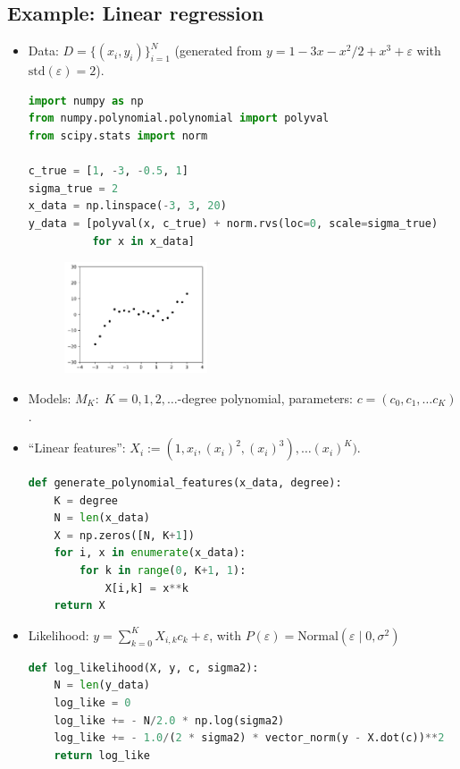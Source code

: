 \newpage
\subsection{Example: Linear regression}
\begin{itemize}
	\item Data: $D = \{(x_i, y_i)\}_{i=1}^N$ (generated from $y = 1 - 3x - x^2/2 + x^3 + \varepsilon$ with $\text{std}(\varepsilon) = 2$).
\begin{lstlisting}[language=python]
import numpy as np
from numpy.polynomial.polynomial import polyval
from scipy.stats import norm

c_true = [1, -3, -0.5, 1]
sigma_true = 2
x_data = np.linspace(-3, 3, 20)
y_data = [polyval(x, c_true) + norm.rvs(loc=0, scale=sigma_true) 
          for x in x_data]
\end{lstlisting}
	\begin{figure}[h]
		\centering
		\includegraphics[width=0.4\textwidth]{./figs/03-linear-regression-data.pdf}
	\end{figure}
	\item Models: $M_K:\;K=0,1,2,\ldots$-degree polynomial, parameters: $c = (c_0, c_1, \ldots c_K)$.
	\item ``Linear features'': $X_i := (1, x_i, (x_i)^2, (x_i)^3),\ldots (x_i)^K)$.
\begin{lstlisting}[language=python]
def generate_polynomial_features(x_data, degree):
    K = degree
    N = len(x_data)
    X = np.zeros([N, K+1])
    for i, x in enumerate(x_data):
        for k in range(0, K+1, 1):
            X[i,k] = x**k
    return X
\end{lstlisting}

	\item Likelihood:
	$y = \sum_{k=0}^K X_{i,k} c_k  + \varepsilon$, with $P(\varepsilon) = \text{Normal}(\varepsilon \;|\; 0, \sigma^2)$
\begin{lstlisting}[language=python]
def log_likelihood(X, y, c, sigma2):
    N = len(y_data)
    log_like = 0
    log_like += - N/2.0 * np.log(sigma2)
    log_like += - 1.0/(2 * sigma2) * vector_norm(y - X.dot(c))**2
    return log_like
\end{lstlisting}


\end{itemize}
